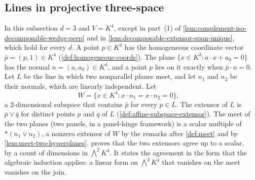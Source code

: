 \subsection{Lines in projective three-space}

In this subsection $d = 3$ and $V = K^4$, except in part~(1)
of \cref{lem:complement-iso-decomposable-wedge-perp} and in
\cref{lem:decomposable-extensor-span-unique}, which hold for every $d$.
A point $p \in K^3$ has the homogeneous coordinate vector
$\bar p = (p, 1) \in K^4$ (\cref{def:homogeneous-coords}). The plane
$\{x \in K^3 : a \cdot x + a_0 = 0\}$ has the normal
$n = (a, a_0) \in K^4$, and a point $p$ lies on it exactly when
$\bar p \cdot n = 0$. Let $L$ be the line in which two nonparallel planes
meet, and let $n_1$ and $n_2$ be their normals, which are linearly
independent. Let
\[
  W = \{x \in K^4 : x \cdot n_1 = x \cdot n_2 = 0\},
\]
a $2$-dimensional subspace that contains $\bar p$ for every $p \in L$.
The extensor of $L$ is $\bar p \vee \bar q$ for distinct points $p$ and
$q$ of $L$ (\cref{def:affine-subspace-extensor}). The meet of the two
planes (two panels, in a panel-hinge framework) is a scalar multiple of
$*(n_1 \vee n_2)$, a nonzero extensor of $W$ by the remarks after
\cref{def:meet} and by \cref{lem:meet-two-hyperplanes}.
 proves
that the two extensors agree up to a scalar, by a count of dimensions in
$\bigwedge^2 K^4$. It states the agreement in the form that the
algebraic induction applies: a linear form on $\bigwedge^2 K^4$ that
vanishes on the meet vanishes on the join.

